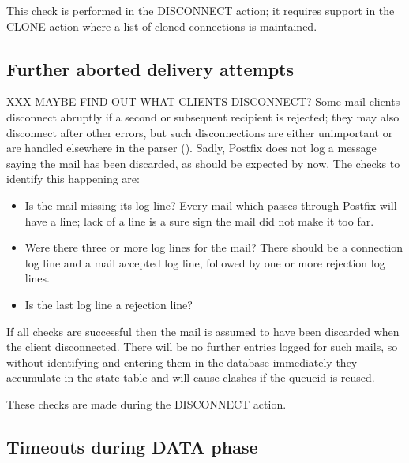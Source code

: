 This check is performed in the DISCONNECT action; it requires support in
the CLONE action where a list of cloned connections is maintained.

\subsection{Further aborted delivery attempts}

XXX MAYBE FIND OUT WHAT CLIENTS DISCONNECT\@?  Some mail clients disconnect
abruptly if a second or subsequent recipient is rejected; they may also
disconnect after other errors, but such disconnections are either
unimportant or are handled elsewhere in the parser
().  Sadly, Postfix does not log a
message saying the mail has been discarded, as should be expected by now.
The checks to identify this happening are:

\begin{itemize}

    \item Is the mail missing its  log line?  Every mail
        which passes through Postfix will have a  line;
        lack of a  line is a sure sign the mail did not
        make it too far.

    \item Were there three or more  log lines for the mail?
        There should be a connection log line and a mail accepted log line,
        followed by one or more rejection log lines.

    \item Is the last  log line a rejection line?

\end{itemize}

If all checks are successful then the mail is assumed to have been
discarded when the client disconnected.  There will be no further entries
logged for such mails, so without identifying and entering them in the
database immediately they accumulate in the state table and will cause
clashes if the queueid is reused.

These checks are made during the DISCONNECT action.

\subsection{Timeouts during DATA phase}

\label{timeouts-during-data-phase}

